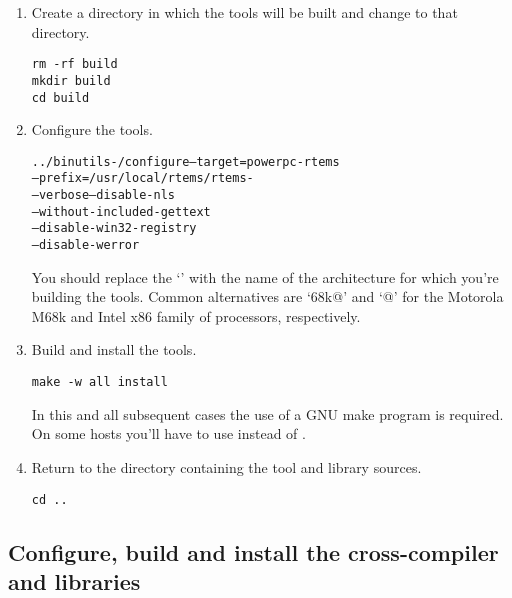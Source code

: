 \documentclass{report}
\begin{document}
\begin{enumerate}
\item Create a directory in which the tools will be built and
change to that directory.
\begin{verbatim}
rm -rf build
mkdir build
cd build
\end{verbatim}

\item Configure the tools.
\begin{alltt}
../binutils-\BINUTILS/configure --target=powerpc-rtems\rtemsVersion \verb@\@
             --prefix=/usr/local/rtems/rtems-\rtemsVersion \verb@\@
             --verbose --disable-nls \verb@\@
             --without-included-gettext \verb@\@
             --disable-win32-registry \verb@\@
             --disable-werror 

\end{alltt}
You should replace the `\verb@powerpc@' with the name of the architecture
for which you're
building the tools.  Common alternatives are `\verb@m68k@' and `@' for
the Motorola M68k and Intel x86 family of processors, respectively.

\item Build and install the tools.
\begin{verbatim}
make -w all install
\end{verbatim}
In this and all subsequent cases the use of a GNU make program is required.
On some hosts you'll have to use \verb@gmake@ instead of \verb@make@.

\item Return to the directory containing the tool and library sources.
\begin{verbatim}
cd ..
\end{verbatim}
\end{enumerate}

\subsection {Configure, build and install the cross-compiler and libraries}
\end{document}
